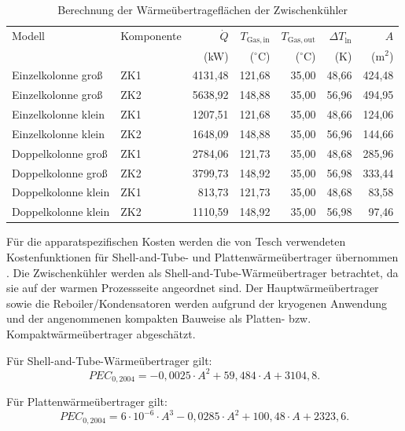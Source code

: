 \begin{table}[H]
\centering
\caption{Berechnung der Wärmeübertrageflächen der Zwischenkühler}
\label{tab:waermeuebertrager_flaechen_zk}
\begin{tabular}{llrrrrr}
\hline
Modell & Komponente & $\dot Q$ & $T_\mathrm{Gas,in}$ & $T_\mathrm{Gas,out}$ & $\Delta T_{\ln}$ & $A$ \\
 & & (kW) & ($^\circ$C) & ($^\circ$C) & (K) & (m$^2$) \\
\hline
Einzelkolonne groß & ZK1 & 4131{,}48 & 121{,}68 & 35{,}00 & 48{,}66 & 424{,}48 \\
Einzelkolonne groß & ZK2 & 5638{,}92 & 148{,}88 & 35{,}00 & 56{,}96 & 494{,}95 \\
Einzelkolonne klein & ZK1 & 1207{,}51 & 121{,}68 & 35{,}00 & 48{,}66 & 124{,}06 \\
Einzelkolonne klein & ZK2 & 1648{,}09 & 148{,}88 & 35{,}00 & 56{,}96 & 144{,}66 \\
Doppelkolonne groß & ZK1 & 2784{,}06 & 121{,}73 & 35{,}00 & 48{,}68 & 285{,}96 \\
Doppelkolonne groß & ZK2 & 3799{,}73 & 148{,}92 & 35{,}00 & 56{,}98 & 333{,}44 \\
Doppelkolonne klein & ZK1 & 813{,}73 & 121{,}73 & 35{,}00 & 48{,}68 & 83{,}58 \\
Doppelkolonne klein & ZK2 & 1110{,}59 & 148{,}92 & 35{,}00 & 56{,}98 & 97{,}46 \\
\hline
\end{tabular}
\end{table}

Für die apparatspezifischen Kosten werden die von Tesch verwendeten
Kostenfunktionen für Shell-and-Tube- und Plattenwärmeübertrager übernommen
\cite{teschExergybasedMethodsApplied}. Die Zwischenkühler werden als
Shell-and-Tube-Wärmeübertrager betrachtet, da sie auf der warmen Prozessseite
angeordnet sind. Der Hauptwärmeübertrager sowie die Reboiler/Kondensatoren werden
aufgrund der kryogenen Anwendung und der angenommenen kompakten Bauweise als
Platten- bzw. Kompaktwärmeübertrager abgeschätzt.

Für Shell-and-Tube-Wärmeübertrager gilt:
\begin{equation}
PEC_{0,2004} =
-0{,}0025 \cdot A^2 + 59{,}484 \cdot A + 3104{,}8 .
\end{equation}

Für Plattenwärmeübertrager gilt:
\begin{equation}
PEC_{0,2004} =
6 \cdot 10^{-6} \cdot A^3
-0{,}0285 \cdot A^2
+100{,}48 \cdot A
+2323{,}6 .
\end{equation}

